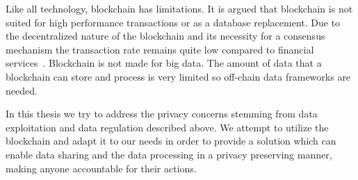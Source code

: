 Like all technology, blockchain has limitations. It is argued that blockchain is not suited for high performance transactions or as a database replacement. Due to the decentralized nature of the blockchain and its necessity for a consensus mechanism the transaction rate remains quite low compared to financial services~\cite{Sompolinsky2015, Zohar:2015:BUH:2817191.2701411}. Blockchain is not made for big data. The amount of data that a blockchain can store and process is very limited so off-chain data frameworks are needed.

In this thesis we try to address the privacy concerns stemming from data exploitation and data regulation described above. We attempt to utilize the blockchain and adapt it to our needs in order to provide a solution which can enable data sharing and the data processing in a privacy preserving manner, making anyone accountable for their actions.
